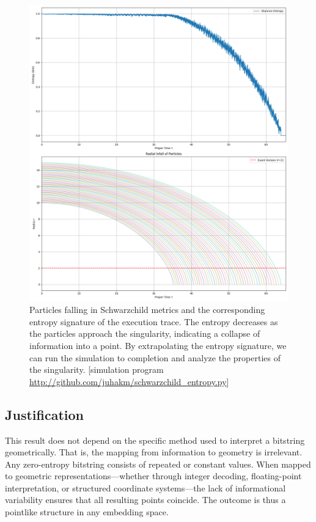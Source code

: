 \documentclass[11pt]{article}
\begin{document}
\begin{figure}[h!]
  \centering
  \includegraphics[width=1.0\textwidth]{figures/blackhole_signature.png}
  \caption{Particles falling in Schwarzchild metrics and the corresponding entropy signature of the execution trace. The entropy decreases as the particles approach the singularity, indicating a collapse of information into a point. By extrapolating the entropy signature, we can run the simulation to completion and analyze the properties of the singularity.
      [simulation program \url{http://github.com/juhakm/schwarzchild_entropy.py}]}
  \label{fig:vanishing_entropy}
\end{figure}



\subsection*{Justification}

This result does not depend on the specific method used to interpret a bitstring geometrically. That is, the mapping from information to geometry is irrelevant. Any zero-entropy bitstring consists of repeated or constant values. When mapped to geometric representations---whether through integer decoding, floating-point interpretation, or structured coordinate systems---the lack of informational variability ensures that all resulting points coincide. The outcome is thus a pointlike structure in
any embedding space.
\end{document}
